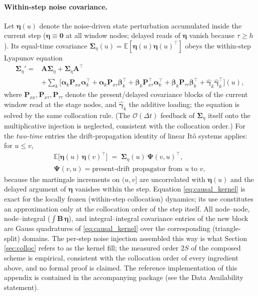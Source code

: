 \documentclass[preprint,12pt]{elsarticle}
\begin{document}
\paragraph{Within-step noise covariance.} Let $\boldsymbol\eta(u)$ denote the noise-driven state perturbation accumulated inside the current step ($\boldsymbol\eta \equiv \mathbf{0}$ at all window nodes; delayed reads of $\boldsymbol\eta$ vanish because $\tau \ge h$). Its equal-time covariance $\boldsymbol\Sigma_\eta(u) = \mathbb{E}[\boldsymbol\eta(u)\boldsymbol\eta(u)^\top]$ obeys the within-step Lyapunov equation
\begin{equation}
\begin{split}
\boldsymbol\Sigma_\eta' = {}& \mathbf{A}\boldsymbol\Sigma_\eta + \boldsymbol\Sigma_\eta \mathbf{A}^\top \\
&+ \sum_k \Big[\boldsymbol\alpha_k \mathbf{P}_{xx} \boldsymbol\alpha_k^\top + \boldsymbol\alpha_k \mathbf{P}_{x\tau} \boldsymbol\beta_k^\top + \boldsymbol\beta_k \mathbf{P}_{x\tau}^\top \boldsymbol\alpha_k^\top + \boldsymbol\beta_k \mathbf{P}_{\tau\tau} \boldsymbol\beta_k^\top + \hat{\boldsymbol\gamma}_k\hat{\boldsymbol\gamma}_k^\top\Big](u),
\end{split}
\end{equation}
where $\mathbf{P}_{xx}, \mathbf{P}_{x\tau}, \mathbf{P}_{\tau\tau}$ denote the present/delayed covariance blocks of the current window read at the stage nodes, and $\hat{\boldsymbol\gamma}_k$ the additive loading; the equation is solved by the same collocation rule. (The $\mathcal{O}(\Delta t)$ feedback of $\boldsymbol\Sigma_\eta$ itself onto the multiplicative injection is neglected, consistent with the collocation order.) For the \emph{two-time} entries the drift-propagation identity of linear It\^o systems applies: for $u \le v$,
\begin{equation}
\label{eq:causal_kernel}
\begin{gathered}
\mathbb{E}\big[\boldsymbol\eta(u)\,\boldsymbol\eta(v)^\top\big] \;=\; \boldsymbol\Sigma_\eta(u)\, \boldsymbol\Psi(v,u)^\top, \\
\boldsymbol\Psi(v,u) = \text{present-drift propagator from } u \text{ to } v,
\end{gathered}
\end{equation}
because the martingale increments on $(u,v]$ are uncorrelated with $\boldsymbol\eta(u)$ and the delayed argument of $\boldsymbol\eta$ vanishes within the step. Equation \eqref{eq:causal_kernel} is exact for the locally frozen (within-step collocation) dynamics; its use constitutes an approximation only at the collocation order of the step itself. All node--node, node--integral ($\int \mathbf{B}\,\boldsymbol\eta$), and integral--integral covariance entries of the new block are Gauss quadratures of \eqref{eq:causal_kernel} over the corresponding (triangle-split) domains. The per-step noise injection assembled this way is what Section \ref{sec:colloc} refers to as the kernel fill; the measured order $2S$ of the composed scheme is empirical, consistent with the collocation order of every ingredient above, and no formal proof is claimed. The reference implementation of this appendix is contained in the accompanying package (see the Data Availability statement).
\end{document}
